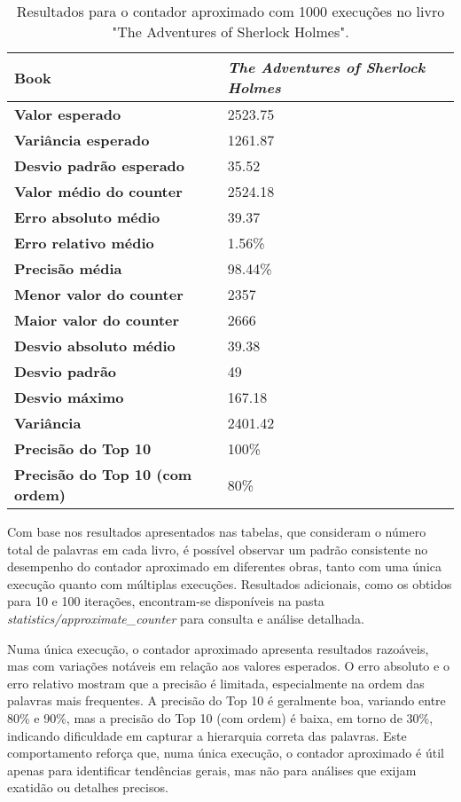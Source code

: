 \documentclass[shortpaper, portugues, times, mirror]{revdetua}
\begin{document}
\begin{table}[H]
\centering
\begin{tabular}{|l|p{2cm}|}
\hline
\textbf{Book}            & \textit{The Adventures of  Sherlock Holmes}\\ \hline
\textbf{Valor esperado}         & 2523.75\\ \hline
\textbf{Variância esperado}       & 1261.87\\ \hline
\textbf{Desvio padrão esperado}   & 35.52\\ \hline
\textbf{Valor médio do counter}   & 2524.18\\ \hline
\textbf{Erro absoluto médio}   & 39.37\\ \hline
\textbf{Erro relativo médio}   & 1.56\%\\ \hline
\textbf{Precisão média}   & 98.44\%\\ \hline
\textbf{Menor valor do counter}   & 2357\\ \hline
\textbf{Maior valor do counter}   & 2666\\ \hline
\textbf{Desvio absoluto médio}   & 39.38\\ \hline
\textbf{Desvio padrão}   & 49\\ \hline
\textbf{Desvio máximo}   & 167.18\\ \hline
\textbf{Variância}   & 2401.42\\ \hline
\textbf{Precisão do Top 10}   & 100\%\\ \hline
\textbf{Precisão do Top 10 (com ordem)}   & 80\%\\ \hline
\end{tabular}
\caption{Resultados para o contador aproximado com 1000 execuções no livro "The Adventures of Sherlock Holmes".}
\label{tab:approximate}
\end{table}

Com base nos resultados apresentados nas tabelas, que consideram o número total de palavras em cada livro, é possível observar um padrão consistente no desempenho do contador aproximado em diferentes obras, tanto com uma única execução quanto com múltiplas execuções. Resultados adicionais, como os obtidos para 10 e 100 iterações, encontram-se disponíveis na pasta \textit{statistics/approximate\_counter} para consulta e análise detalhada.

Numa única execução, o contador aproximado apresenta resultados razoáveis, mas com variações notáveis em relação aos valores esperados. O erro absoluto e o erro relativo mostram que a precisão é limitada, especialmente na ordem das palavras mais frequentes. A precisão do Top 10 é geralmente boa, variando entre 80\% e 90\%, mas a precisão do Top 10 (com ordem) é baixa, em torno de 30\%, indicando dificuldade em capturar a hierarquia correta das palavras. Este comportamento reforça que, numa única execução, o contador aproximado é útil apenas para identificar tendências gerais, mas não para análises que exijam exatidão ou detalhes precisos.
\end{document}
